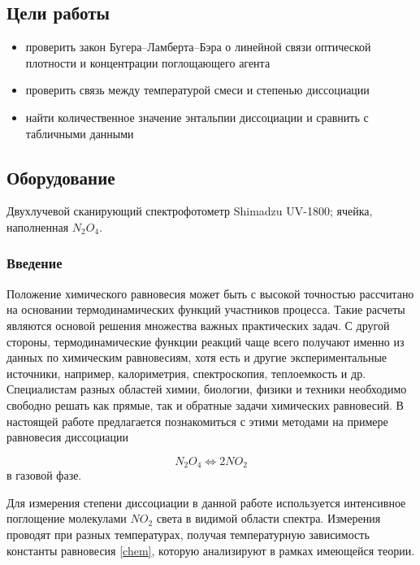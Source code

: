 \documentclass[a4paper,12pt]{article} %
\begin{document}
\newpage
\setcounter{page}{2}

\subsection*{Цели работы}

\begin{itemize}
	\item проверить закон Бугера--Ламберта--Бэра о линейной связи оптической плотности и концентрации поглощающего агента
	\item проверить связь между температурой смеси и степенью диссоциации
	\item найти количественное значение энтальпии диссоциации и сравнить с табличными данными
\end{itemize}




\subsection*{Оборудование}
Двухлучевой сканирующий спектрофотометр Shimadzu UV-1800; ячейка, наполненная \(N_2O_4\).

\subsubsection*{Введение}

Положение химического равновесия может быть с высокой точностью рассчитано на основании термодинамических функций участников процесса. Такие расчеты являются основой решения множества важных практических задач. С другой стороны, термодинамические функции реакций чаще всего получают именно из данных по химическим равновесиям, хотя есть и другие экспериментальные источники, например, калориметрия, спектроскопия, теплоемкость и др. Специалистам разных областей химии, биологии, физики и техники необходимо свободно решать как прямые, так и обратные задачи химических равновесий.
В настоящей работе предлагается познакомиться с этими методами на примере равновесия диссоциации

\begin{equation}\label{chem}
N_2O_4 \Leftrightarrow 2NO_2
\end{equation}
в газовой фазе.

Для измерения степени диссоциации в данной работе используется интенсивное поглощение молекулами \(NO_2\) света в видимой области спектра. Измерения проводят при разных температурах, получая температурную зависимость константы равновесия \eqref{chem}, которую анализируют в рамках имеющейся теории.
\end{document}
